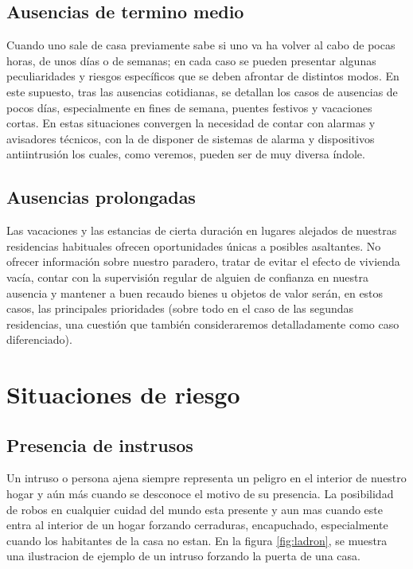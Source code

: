 \subsection{Ausencias de termino medio}
Cuando uno sale de casa previamente sabe si uno va ha volver al cabo de pocas horas, de unos días o de semanas; en cada caso se pueden presentar algunas peculiaridades y riesgos específicos que se deben afrontar de distintos modos. En este supuesto, tras las ausencias cotidianas, se detallan los casos de ausencias de pocos días, especialmente en fines de semana, puentes festivos y vacaciones cortas. En estas situaciones convergen la necesidad de contar con alarmas y avisadores técnicos, con la de disponer de sistemas de alarma y dispositivos antiintrusión los cuales, como veremos, pueden ser de muy diversa índole.\\

\subsection{Ausencias prolongadas}
Las vacaciones y las estancias de cierta duración en lugares alejados de nuestras residencias habituales ofrecen oportunidades únicas a posibles asaltantes. No ofrecer información sobre nuestro paradero, tratar de evitar el efecto de vivienda vacía, contar con la supervisión regular de alguien de confianza en nuestra ausencia y mantener a buen recaudo bienes u objetos de valor serán, en estos casos, las principales prioridades (sobre todo en el caso de las segundas residencias, una cuestión que también consideraremos detalladamente como caso diferenciado).\\

\section{Situaciones de riesgo}
\subsection{Presencia de instrusos}
Un intruso o persona ajena siempre representa un peligro en el interior de nuestro hogar y aún más cuando se desconoce el motivo de su presencia. La posibilidad de robos en cualquier cuidad del mundo esta presente y aun mas cuando este entra al interior de un hogar forzando cerraduras, encapuchado, especialmente cuando los habitantes de la casa no estan. En la figura \ref{fig:ladron}, se muestra una ilustracion de ejemplo de un intruso forzando la puerta de una casa.\\

